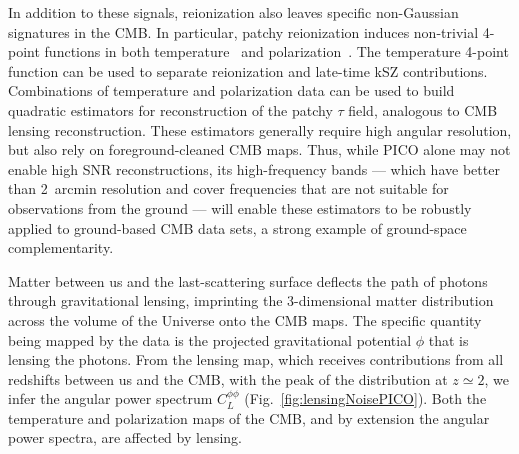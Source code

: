 \documentclass[PICOReport.tex]{subfiles}
\begin{document}
In addition to these signals, reionization also leaves specific non-Gaussian signatures in the CMB.  In particular, patchy reionization induces non-trivial 4-point functions in both temperature~\citep{SmithFerraro2017} and polarization~\citep{DvorkinSmith2009}.  The temperature 4-point function can be used to separate reionization and late-time kSZ contributions.  Combinations of temperature and polarization data can be used to build quadratic estimators for reconstruction of the patchy $\tau$ field, analogous to CMB lensing reconstruction.  These estimators generally require high angular resolution, but also rely on foreground-cleaned CMB maps.  Thus, while PICO alone may not enable high \ac{SNR} reconstructions, its high-frequency bands --- which have better than 2~arcmin resolution and cover frequencies that are not suitable for observations from the ground --- will enable these estimators to be robustly applied to ground-based CMB data sets, a strong example of ground-space complementarity.  %
%

\vspace{0.1in}
 \hspace{0.1in} \label{gravitationallensing}
Matter between us and the last-scattering surface deflects the path of photons through gravitational lensing, imprinting the 3-dimensional matter distribution across the volume of the Universe onto the CMB maps. The specific quantity being mapped by the data is the projected gravitational potential $\phi$ that is lensing the photons. From the lensing map, which
receives contributions from all redshifts between us and the CMB, with the peak of the distribution at $z \simeq 2$, we infer the angular power spectrum $C_{L}^{\phi \phi}$ (Fig.~\ref{fig:lensingNoisePICO}). %
Both the temperature and polarization maps of the CMB, and by extension the angular power spectra, are affected by lensing. 
\end{document}
